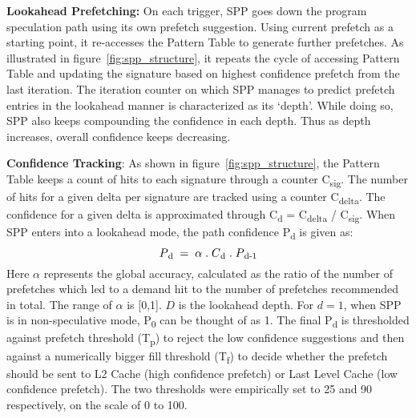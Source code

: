 
\noindent \textbf{Lookahead Prefetching:} On each trigger, SPP goes
down the program speculation path using its own prefetch suggestion.
Using current prefetch as a starting point, it re-accesses the Pattern
Table to generate further prefetches.  As illustrated in
figure~\ref{fig:spp_structure}, it repeats the cycle of accessing
Pattern Table and updating the signature based on highest confidence
prefetch from the last iteration.  The iteration counter on which SPP
manages to predict prefetch entries in the lookahead manner is
characterized as its `depth'. While doing so, SPP also keeps
compounding the confidence in each depth. Thus as depth increases,
overall confidence keeps decreasing.

\noindent \textbf{Confidence Tracking}: As shown in
figure~\ref{fig:spp_structure}, the Pattern Table keeps a count of
hits to each signature through a counter C\textsubscript{sig}. The
number of hits for a given delta per signature are tracked using a
counter C\textsubscript{delta}.  The confidence for a given delta is
approximated through C\textsubscript{d} = C\textsubscript{delta} /
C\textsubscript{sig}.  When SPP enters into a lookahead mode, the path
confidence P\textsubscript{d} is given as:
$$P\textsubscript{d} \;=\; \alpha  \;.\;  C\textsubscript{d}  \;.\;
P\textsubscript{d-1}$$ Here $\alpha$ represents the global accuracy,
calculated as the ratio of the number of prefetches which led to a
demand hit to the number of prefetches recommended in total. The range
of $\alpha$ is [0,1].  $D$ is the lookahead depth. For $d = 1$, when
SPP is in non-speculative mode, P\textsubscript{0} can be thought of
as 1.  The final P\textsubscript{d} is thresholded against prefetch
threshold (T\textsubscript{p}) to reject the low confidence
suggestions and then against a numerically bigger fill threshold
(T\textsubscript{f}) to decide whether the prefetch should be sent to
L2 Cache (high confidence prefetch) or Last Level Cache (low
confidence prefetch).  The two thresholds were empirically set to 25
and 90 respectively, on the scale of 0 to 100.

